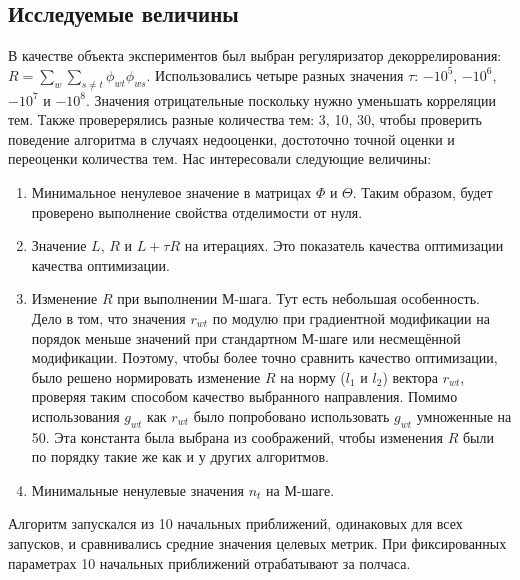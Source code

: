 \documentclass[12pt]{article}
\begin{document}
\subsection{Исследуемые величины}
В качестве объекта экспериментов был выбран регуляризатор декоррелирования: $R = \sum_w \sum_{s \neq t} \phi_{wt} \phi_{ws}$. Использовались четыре разных значения $\tau$: $-10^5$, $-10^6$, $-10^7$ и $-10^8$. Значения отрицательные поскольку нужно уменьшать корреляции тем. Также проверерялись разные количества тем: 3, 10, 30, чтобы проверить поведение алгоритма в случаях недооценки, достоточно точной оценки и переоценки  количества тем.  Нас интересовали следующие величины:
\begin{enumerate}
\item Минимальное ненулевое значение в матрицах $\Phi$ и $\Theta$. Таким образом, будет проверено выполнение свойства отделимости от нуля.
\item Значение $L$, $R$ и $L + \tau R$ на итерациях. Это показатель качества оптимизации качества оптимизации.
\item Изменение $R$ при выполнении М-шага. Тут есть  небольшая особенность. Дело в том, что значения $r_{wt}$ по модулю  при градиентной модификации на порядок меньше значений при стандартном М-шаге или несмещённой модификации. Поэтому, чтобы более точно сравнить качество оптимизации,  было решено нормировать изменение $R$ на норму ($l_1$ и $l_2$) вектора $r_{wt}$, проверяя таким способом качество выбранного направления. Помимо использования $g_{wt}$ как $r_{wt}$ было попробовано использовать $g_{wt}$ умноженные на 50. Эта константа была выбрана из соображений, чтобы изменения $R$ были по порядку такие же как и у других алгоритмов.
\item Минимальные ненулевые значения $n_t$  на М-шаге.
\end{enumerate}
Алгоритм  запускался из 10 начальных приближений, одинаковых для всех запусков, и сравнивались средние значения целевых метрик. При фиксированных параметрах 10 начальных приближений отрабатывают за полчаса.
\end{document}
